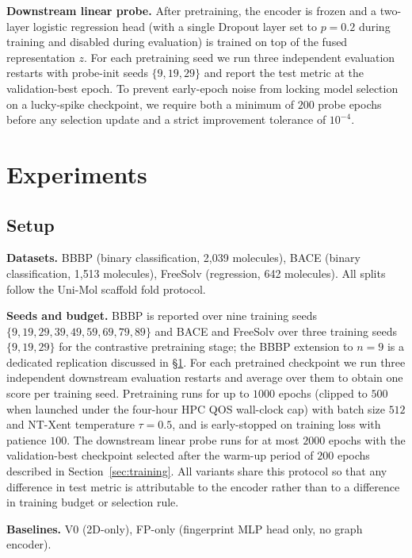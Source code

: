 \documentclass[conference]{IEEEtran}
\begin{document}
\noindent\textbf{Downstream linear probe.} After pretraining, the encoder is frozen and a two-layer logistic regression head (with a single Dropout layer set to $p{=}0.2$ during training and disabled during evaluation) is trained on top of the fused representation $z$. For each pretraining seed we run three independent evaluation restarts with probe-init seeds $\{9,19,29\}$ and report the test metric at the validation-best epoch. To prevent early-epoch noise from locking model selection on a lucky-spike checkpoint, we require both a minimum of $200$ probe epochs before any selection update and a strict improvement tolerance of $10^{-4}$.

\section{Experiments}
\label{sec:experiments}

\subsection{Setup}
\noindent\textbf{Datasets.} BBBP (binary classification, 2{,}039 molecules), BACE (binary classification, 1{,}513 molecules), FreeSolv (regression, 642 molecules). All splits follow the Uni-Mol scaffold fold protocol.

\noindent\textbf{Seeds and budget.} BBBP is reported over nine training seeds $\{9,19,29,39,49,59,69,79,89\}$ and BACE and FreeSolv over three training seeds $\{9,19,29\}$ for the contrastive pretraining stage; the BBBP extension to $n{=}9$ is a dedicated replication discussed in \S\ref{sec:experiments}. For each pretrained checkpoint we run three independent downstream evaluation restarts and average over them to obtain one score per training seed. Pretraining runs for up to $1000$ epochs (clipped to $500$ when launched under the four-hour HPC QOS wall-clock cap) with batch size $512$ and NT-Xent temperature $\tau{=}0.5$, and is early-stopped on training loss with patience $100$. The downstream linear probe runs for at most $2000$ epochs with the validation-best checkpoint selected after the warm-up period of $200$ epochs described in Section~\ref{sec:training}. All variants share this protocol so that any difference in test metric is attributable to the encoder rather than to a difference in training budget or selection rule.

\noindent\textbf{Baselines.} V0 (2D-only), FP-only (fingerprint MLP head only, no graph encoder).
\end{document}
